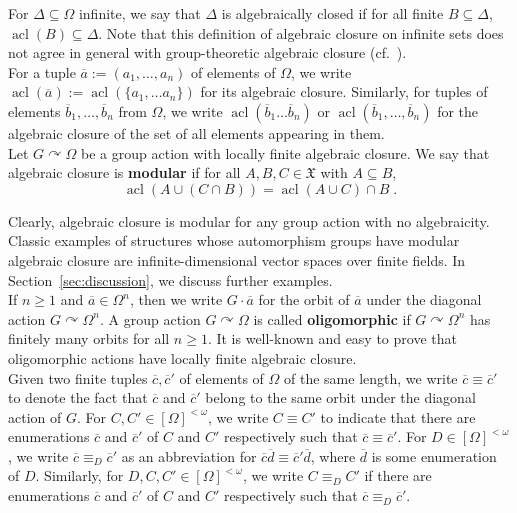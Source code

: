 \documentclass{article}
\theoremstyle{remark}
\theoremstyle{definition}
\def\acts{\curvearrowright}
\DeclareMathOperator{\acl}{acl}
\def\a{\overline{a}}
\newcommand{\X}[0]{\mathfrak{X}}
\newcommand{\fps}[1]{[#1]^{<\omega}}
\newcommand{\orq}[0]{\equiv}
\renewcommand\geq{\geqslant}
\begin{document}
{{For $\Delta\subseteq\Omega$ infinite, we say that $\Delta$ is algebraically closed if for all finite $B\subseteq\Delta$, $\acl(B)\subseteq\Delta$.
Note that this definition of algebraic closure on infinite sets does not agree in general with group-theoretic algebraic closure (cf.~\cite[Chapter 4.1]{hodges1993model}).\\ 

    For a tuple $\overline{a}:=(a_1, \dots, a_n)$ of elements of $\Omega$, we write $\acl(\overline{a}):=\acl(\{a_1, \dots a_n\})$ for its algebraic closure. %
    Similarly, for tuples of elements $\overline{b}_1, \dots, \overline{b}_n$ from $\Omega$, we write $\acl(\overline{b}_1 \dots \overline{b}_n)$ or $\acl(\overline{b}_1, \dots, \overline{b}_n)$ for the algebraic closure of the set of all elements appearing in them.\\


    {Let $G\acts\Omega$ be a group action with locally finite algebraic closure. We say that algebraic closure is \textbf{modular} 
    if for all $A,B,C\in\X$ with $A\subseteq B$,}  
  \[\acl(A\cup(C\cap B))=\acl(A\cup C)\cap B\;.\]  

{Clearly, algebraic closure is modular for any group action with no algebraicity. Classic examples of structures whose automorphism groups have modular algebraic closure are %
{infinite-dimensional vector spaces over finite fields.}
In Section~\ref{sec:discussion}, we  discuss further  examples.\\ 

    

{If $n\geq 1$ and  $\a\in \Omega^n$, then we write $G\cdot \a$ for the orbit of $\a$ under the diagonal action $G\acts \Omega^n$.} A group action $G\acts\Omega$ is called \textbf{oligomorphic} if $G\acts\Omega^n$ has finitely many orbits for all $n\geq 1$.  It is well-known and easy to prove that oligomorphic actions have locally finite algebraic closure.\\

Given two finite tuples $\overline{c},\overline{c}'$ of elements of $\Omega$ of the same length, we write $\overline{c}\orq\overline{c}'$ to denote the fact that $\overline{c}$ and $\overline{c}'$ belong to the same orbit under the diagonal action of $G$. For $C, C'\in\fps{\Omega}$, we write $C\orq C'$ to indicate that there are enumerations $\overline{c}$ and $\overline{c}'$ of $C$ and $C'$ respectively such that $\overline{c}\orq\overline{c}'$. For $D\in\fps{\Omega}$, we write $\overline{c}\orq_{D}\overline{c}'$ as an abbreviation for  $\overline{c}\overline{d}\orq \overline{c}'\overline{d}$, where $\overline{d}$ is some enumeration of $D$. Similarly, for $D, C,C'\in\fps{\Omega}$, we write $C\orq_{D}C'$ if there {are} %
enumerations $\overline{c}$ and $\overline{c}'$ of $C$ and $C'$ respectively such that $\overline{c}\orq_{D}\overline{c}'$.%

}}}
\end{document}
